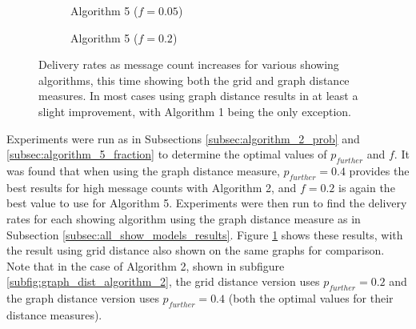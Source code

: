 \documentclass[bsc,frontabs,twoside,singlespacing,parskip,deptreport]{infthesis}     %
\begin{document}
\begin{figure}
\begin{subfigure}[]{0.49\textwidth}
\caption{Algorithm 5 ($f=0.05$)}
\end{subfigure}
%
\par\bigskip 
%
\begin{subfigure}[]{0.49\textwidth}
\caption{Algorithm 5 ($f=0.2$)}
\end{subfigure}
\caption{Delivery rates as message count increases for various showing algorithms, this time showing both the grid and graph distance measures. In most cases using graph distance results in at least a slight improvement, with Algorithm 1 being the only exception.}
\label{fig:graph_dist_show_models}
\end{figure}

Experiments were run as in Subsections \ref{subsec:algorithm_2_prob} and \ref{subsec:algorithm_5_fraction} to determine the optimal values of $p_{further}$ and $f$. It was found that when using the graph distance measure, $p_{further}=0.4$ provides the best results for high message counts with Algorithm 2, and $f=0.2$ is again the best value to use for Algorithm 5. Experiments were then run to find the delivery rates for each showing algorithm using the graph distance measure as in Subsection \ref{subsec:all_show_models_results}. Figure \ref{fig:graph_dist_show_models} shows these results, with the result using grid distance also shown on the same graphs for comparison. Note that in the case of Algorithm 2, shown in subfigure \ref{subfig:graph_dist_algorithm_2}, the grid distance version uses $p_{further}=0.2$ and the graph distance version uses $p_{further}=0.4$ (both the optimal values for their distance measures).
\end{document}
